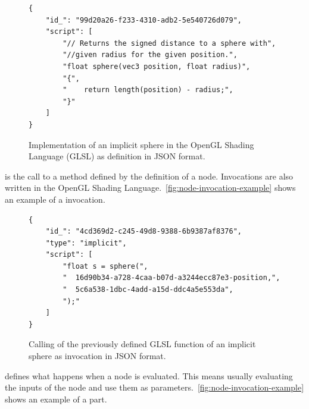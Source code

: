 \documentclass[%
    a4paper,    %
    justified,  %
    nobib,      %
    openany     %
]{tufte-book}
\makeatletter
\renewcommand{\label}[1]{\@tufte@label{##1}}%
\makeatother
\begin{document}
\begin{figure}
  \begin{verbatim}
{
    "id_": "99d20a26-f233-4310-adb2-5e540726d079",
    "script": [
        "// Returns the signed distance to a sphere with",
        "//given radius for the given position.",
        "float sphere(vec3 position, float radius)",
        "{",
        "    return length(position) - radius;",
        "}"
    ]
}
  \end{verbatim}
\caption{Implementation of an implicit sphere in the OpenGL Shading Language
  (GLSL) as definition in JSON format.}
\label{fig:node-definition-example}
\end{figure}

 is the call to a method defined by
the definition of a node. Invocations are also written in the OpenGL Shading
Language.~\cref{fig:node-invocation-example} shows an example of a invocation.

\begin{figure}
  \begin{verbatim}
{
    "id_": "4cd369d2-c245-49d8-9388-6b9387af8376",
    "type": "implicit",
    "script": [
        "float s = sphere(",
        "  16d90b34-a728-4caa-b07d-a3244ecc87e3-position,",
        "  5c6a538-1dbc-4add-a15d-ddc4a5e553da",
        ");"
    ]
}
  \end{verbatim}
\caption{Calling of the previously defined GLSL function of an implicit sphere
  as invocation in JSON format.}
\label{fig:node-invocation-example}
\end{figure}

 defines what happens when a node is
evaluated. This means usually evaluating the inputs of the node and use them as
parameters.~\cref{fig:node-invocation-example} shows an example of a part.
\end{document}
